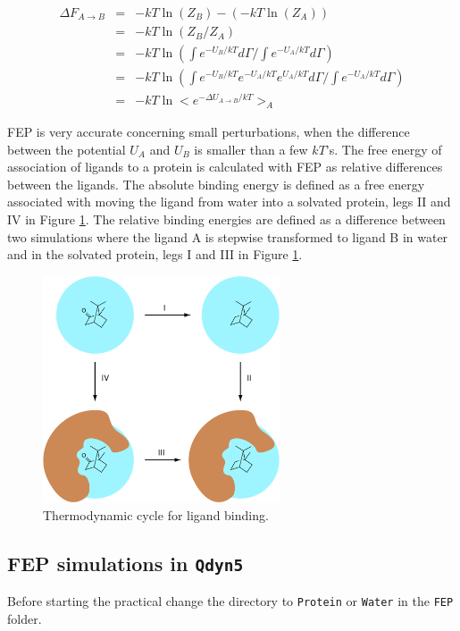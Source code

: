 \documentclass[a4paper,12pt]{article}
\newcommand{\qdyn}{\texttt{Qdyn5}}
\begin{document}
\begin{eqnarray}
  \nonumber \Delta F_{A \rightarrow B}&=&-kT\ln(Z_B)-(-kT\ln(Z_A))\\
  \nonumber &=& -kT\ln(Z_B/Z_A)\\
             &=& -kT\ln(\int e^{-U_B/kT} d \Gamma/\int e^{-U_A/kT} d \Gamma)\\
  \nonumber &=& -kT\ln(\int e^{-U_B/kT}e^{-U_A/kT}e^{U_A/kT} d \Gamma/\int e^{-U_A/kT} d \Gamma)\\
  \nonumber &=& -kT\ln<e^{-\Delta U_{A \rightarrow B}/kT}>_A
\end{eqnarray}

FEP is very accurate concerning small perturbations, when the
difference between the potential $U_A$ and $U_B$ is smaller than
a few $kT$'s. The free energy of association of ligands to a protein is
calculated with FEP as relative differences between the ligands.
The absolute binding energy is defined as a free energy associated
with moving the ligand from water into a solvated protein, legs II and
IV in Figure \ref{fig:fep}. The relative binding energies are
defined as a difference between two simulations where the ligand A
is stepwise transformed to ligand B in water and in the solvated
protein, legs I and III in Figure \ref{fig:fep}.


\begin{figure}
\centering
\includegraphics[width=7cm]{LIE1}
\caption{\label{fig:fep} Thermodynamic cycle for ligand binding.}
\end{figure}
\newpage

\subsection{FEP simulations in \qdyn}

Before starting the practical change the directory to
\texttt{Protein} or \texttt{Water} in the \texttt{FEP} folder.\\
\end{document}
